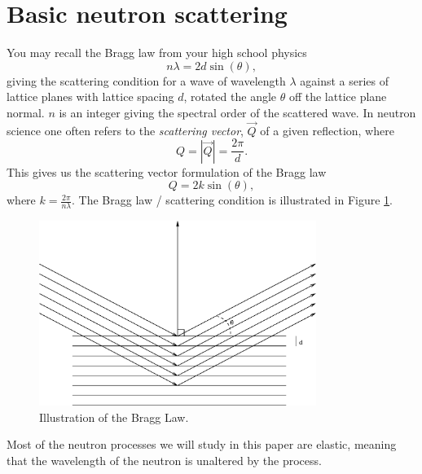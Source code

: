 \documentclass[a4paper]{article}
\begin{document}
\section{Basic neutron scattering}
You may recall the Bragg law from your high school physics
\[n\lambda=2d\sin(\theta),\]
giving the scattering condition for 
a wave of wavelength $\lambda$ against a series of
lattice planes with lattice spacing $d$, rotated the angle $\theta$
off the lattice plane normal. $n$ is an integer giving the spectral
order of the scattered wave. In neutron science one often refers to
the \emph{scattering vector}, $\vec{Q}$ of a given reflection, where
\[Q=|\vec{Q}|=\frac{2\pi}{d}.\]
This gives us the scattering vector formulation of the Bragg law
\[Q=2k\sin(\theta),\]
where $k=\frac{2\pi}{n\lambda}$.
The Bragg law / scattering condition is illustrated in Figure \ref{bragg.eps}.
\begin{figure}[htb!]
\begin{center}
\includegraphics[width=9cm]{pics/bragg.eps}
\end{center}
\caption{Illustration of the Bragg Law.}
\label{bragg.eps}
\end{figure}
Most of the neutron processes we will study in this paper are elastic,
meaning that the wavelength of the neutron is unaltered by the process.
\end{document}
